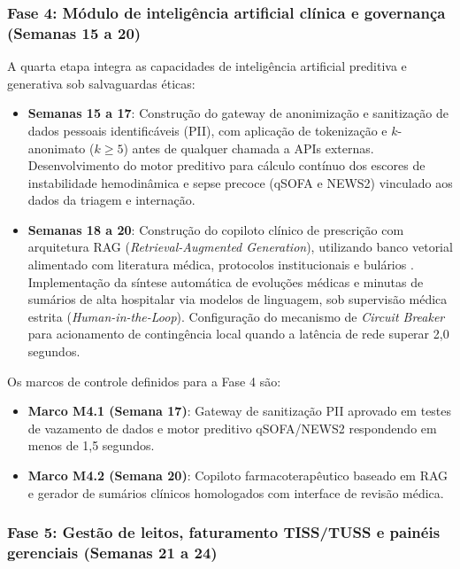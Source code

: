 \subsubsection{Fase 4: Módulo de inteligência artificial clínica e governança (Semanas 15 a 20)}

A quarta etapa integra as capacidades de inteligência artificial preditiva e generativa sob salvaguardas éticas:
\begin{itemize}[leftmargin=*]
    \item \textbf{Semanas 15 a 17}: Construção do gateway de anonimização e sanitização de dados pessoais identificáveis (PII), com aplicação de tokenização e $k$-anonimato ($k \ge 5$) antes de qualquer chamada a APIs externas. Desenvolvimento do motor preditivo para cálculo contínuo dos escores de instabilidade hemodinâmica e sepse precoce (qSOFA e NEWS2) vinculado aos dados da triagem e internação.
    \item \textbf{Semanas 18 a 20}: Construção do copiloto clínico de prescrição com arquitetura RAG (\textit{Retrieval-Augmented Generation}), utilizando banco vetorial alimentado com literatura médica, protocolos institucionais e bulários \cite{lewis_rag:2020}. Implementação da síntese automática de evoluções médicas e minutas de sumários de alta hospitalar via modelos de linguagem, sob supervisão médica estrita (\textit{Human-in-the-Loop}). Configuração do mecanismo de \textit{Circuit Breaker} para acionamento de contingência local quando a latência de rede superar 2,0 segundos.
\end{itemize}

Os marcos de controle definidos para a Fase 4 são:
\begin{itemize}[leftmargin=*]
    \item \textbf{Marco M4.1 (Semana 17)}: Gateway de sanitização PII aprovado em testes de vazamento de dados e motor preditivo qSOFA/NEWS2 respondendo em menos de 1,5 segundos.
    \item \textbf{Marco M4.2 (Semana 20)}: Copiloto farmacoterapêutico baseado em RAG e gerador de sumários clínicos homologados com interface de revisão médica.
\end{itemize}

\subsubsection{Fase 5: Gestão de leitos, faturamento TISS/TUSS e painéis gerenciais (Semanas 21 a 24)}

